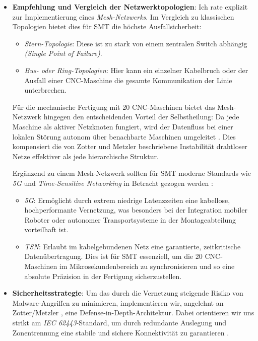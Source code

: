 \begin{itemize}[leftmargin=*]
    \item \textbf{Empfehlung und Vergleich der Netzwerktopologien}: Ich rate explizit zur Implementierung eines \textit{Mesh-Netzwerks}. Im Vergleich zu klassischen Topologien bietet dies für \acs{SMT} die höchste Ausfallsicherheit:
    \begin{itemize}
        \item \textit{Stern-Topologie}: Diese ist zu stark von einem zentralen Switch abhängig \textit{(Single Point of Failure)}.
        \item \textit{Bus- oder Ring-Topologien}: Hier kann ein einzelner Kabelbruch oder der Ausfall einer \acs{CNC}-Maschine die gesamte Kommunikation der Linie unterbrechen.
    \end{itemize}
    Für die mechanische Fertigung mit 20 \acs{CNC}-Maschinen bietet das Mesh-Netzwerk hingegen den entscheidenden Vorteil der Selbstheilung: Da jede Maschine als aktiver Netzknoten fungiert, wird der Datenfluss bei einer lokalen Störung autonom über benachbarte Maschinen umgeleitet \cite[79]{2}. Dies kompensiert die von Zotter und Metzler \cite[7]{2} beschriebene Instabilität drahtloser Netze effektiver als jede hierarchische Struktur.
    
    Ergänzend zu einem Mesh-Netzwerk sollten für \acs{SMT} moderne Standards wie \textit{\acs{5G}} und \textit{Time-Sensitive Networking} in Betracht gezogen werden \cite[132]{2}:
    \begin{itemize}
        \item \textit{\acs{5G}}: Ermöglicht durch extrem niedrige Latenzzeiten eine kabellose, hochperformante Vernetzung, was besonders bei der Integration mobiler Roboter oder autonomer Transportsysteme in der Montageabteilung vorteilhaft ist.
        \item \textit{\acs{TSN}}: Erlaubt im kabelgebundenen Netz eine garantierte, zeitkritische Datenübertragung. Dies ist für \acs{SMT} essenziell, um die 20 \acs{CNC}-Maschinen im Mikrosekundenbereich zu synchronisieren und so eine absolute Präzision in der Fertigung sicherzustellen.
    \end{itemize}
    
    \item \textbf{Sicherheitsstrategie}: Um das durch die Vernetzung steigende Risiko von Malware-Angriffen zu minimieren, implementieren wir, angelehnt an Zotter/Metzler \cite[70]{2}, eine \glqq Defense-in-Depth\grqq-Architektur. Dabei orientieren wir uns strikt am \textit{\acs{IEC} 62443}-Standard, um durch redundante Auslegung und Zonentrennung eine stabile und sichere Konnektivität zu garantieren \cite[73]{2}.
\end{itemize}

